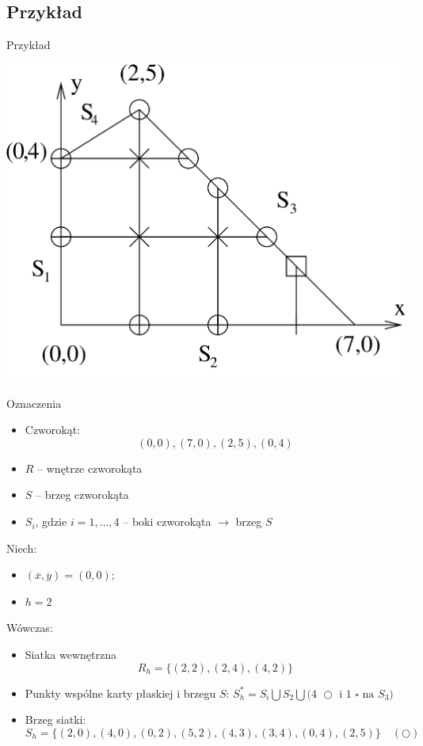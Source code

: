 \subsection{Przykład}

\begin{frame}{Przykład}
  \centerline{\includegraphics[height = 0.85 \textheight]{img/23/przyklad}}
\end{frame}

\begin{frame}
  \begin{block}{Oznaczenia}
    \begin{itemize}
      \item Czworokąt:
            $$(0,0), (7,0), (2,5), (0,4)$$
      \item $R$ -- wnętrze czworokąta
      \item $S$ -- brzeg czworokąta
      \item $S_i$, gdzie $i=1,\dots , 4$ -- boki czworokąta $\rightarrow$ brzeg $S$
    \end{itemize}
  \end{block}
\end{frame}

\begin{frame}
  Niech:
  \begin{itemize}
    \item $(\overline{x},\overline{y}) = (0,0);$
    \item $h=2$
  \end{itemize}

  Wówczas:
  \begin{itemize}
    \item Siatka wewnętrzna \begin{equation}R_h = \{(2,2),(2,4),(4,2)\} \end{equation}
    \item Punkty wspólne karty płaskiej i brzegu $S$: $S_h^* = S_i \bigcup S_2 \bigcup \text{(4 $\bigcirc$ i 1 $\square$ na $S_3$)}$
    \item Brzeg siatki:$$S_h = \{ (2,0),(4,0),(0,2),(5,2),(4,3),(3,4),(0,4),(2,5) \}\quad (\bigcirc)$$
  \end{itemize}
\end{frame}

